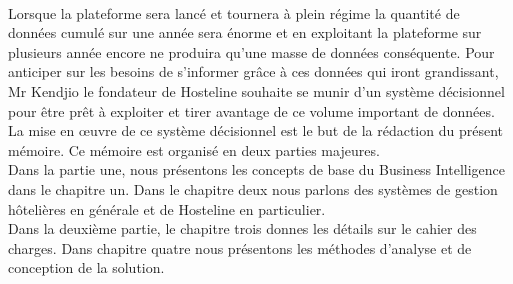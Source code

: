 	\paragraph{}
	Lorsque la plateforme sera lancé et tournera à plein régime la quantité de données cumulé sur une année sera énorme et en exploitant la plateforme sur plusieurs année encore ne produira qu’une masse de données conséquente. Pour anticiper sur les besoins de s’informer grâce à ces données  qui iront grandissant, Mr Kendjio le fondateur de Hosteline souhaite se munir d’un système décisionnel pour être prêt à exploiter et tirer avantage de ce volume important de données. La mise en œuvre de ce système décisionnel est le but de la rédaction du présent mémoire. Ce mémoire est organisé en deux parties majeures.\\
Dans la partie une, nous présentons les concepts de base du Business Intelligence dans le chapitre un. Dans le chapitre deux nous parlons des systèmes de gestion hôtelières en générale et de Hosteline en particulier.\\
	Dans la deuxième partie, le chapitre trois donnes les détails sur le cahier des charges. Dans chapitre quatre nous présentons les méthodes d'analyse et de conception de la solution.


